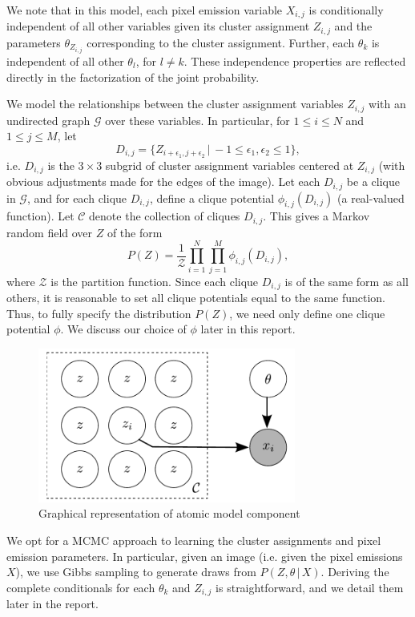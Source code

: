 \documentclass[12pt]{article}
\begin{document}
We note that in this model, each pixel emission variable $X_{i,j}$ is conditionally
independent of all other
variables given its cluster assignment $Z_{i,j}$ and the parameters $\theta_{Z_{i,j}}$
corresponding to the cluster assignment. Further, each $\theta_k$ is independent of all
other $\theta_l$, for $l \neq k$. These independence properties are reflected
directly in the factorization of the joint probability.

We model the relationships between the cluster assignment variables $Z_{i,j}$ with an undirected graph
$\mathcal{G}$ over these variables.
In particular, for $1 \leq i \leq N$ and $1 \leq j \leq M$, let
\[
D_{i,j} = \{Z_{i+\epsilon_1,j+\epsilon_2}\,|\,-1 \leq \epsilon_1, \epsilon_2 \leq 1\},
\]
i.e. $D_{i,j}$ is the $3\times 3$ subgrid of cluster assignment variables centered at $Z_{i,j}$
(with obvious adjustments made for the edges of the image). Let each $D_{i,j}$ be a clique in
$\mathcal{G}$, and for each clique $D_{i,j}$, define a clique potential $\phi_{i,j}(D_{i,j})$
(a real-valued function).
Let $\mathcal{C}$ denote the collection of cliques $D_{i,j}$.
This gives a Markov random field over $Z$ of the form
\[
P(Z) = \frac{1}{\mathcal{Z}}\prod_{i=1}^N\prod_{j=1}^M \phi_{i,j}(D_{i,j}),
\]
where $\mathcal{Z}$ is the partition function.
Since each clique $D_{i,j}$ is of the same form as all others,
it is reasonable to set all clique potentials equal to the same function.
Thus, to fully specify the distribution $P(Z)$, we need only define one clique potential $\phi$.
We discuss our choice of $\phi$ later in this report.

\begin{figure}
    \begin{center}
        \includegraphics[height=2in]{graph.pdf}
        \caption{Graphical representation of atomic model component}
        \label{fig:graph}
    \end{center}
\end{figure}

We opt for a MCMC approach to learning the cluster assignments and pixel emission parameters.
In particular, given an image (i.e. given the pixel emissions $X$), we use Gibbs sampling
to generate draws from $P(Z,\theta\, |\, X)$.
Deriving the complete conditionals for each $\theta_k$ and $Z_{i,j}$ is straightforward,
and we detail them later in the report.
\end{document}
